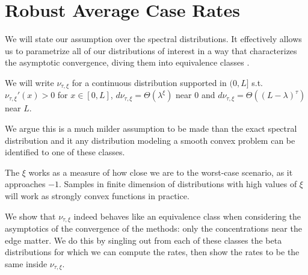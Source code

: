 \documentclass{article}
\begin{document}
\section{Robust Average Case Rates} \label{section: robust average}
We will state our assumption over the spectral distributions. It effectively allows us to parametrize all of our distributions of interest in a way that characterizes the asymptotic convergence, diving them into equivalence classes .

\begin{assumption}
We will write $\nu_{\tau,\xi}$ for a continuous distribution supported in $(0,L]$ s.t. $\nu_{\tau,\xi}'(x)>0$ for $x\in [0,L]$, $d\nu_{\tau,\xi}=\Theta( \lambda^\xi)$ near $0$ and $d\nu_{\tau,\xi}=\Theta( (L-\lambda)^\tau)$ near $L$. 
\label{assumption}
\end{assumption}

We argue this is a much milder assumption to be made than the exact spectral distribution and it  any distribution modeling a smooth convex problem can be identified to one of these classes. 


The $\xi$ works as a measure of how close we are to the worst-case scenario, as it approaches $-1$. Samples in finite dimension of distributions with high values of $\xi$ will work as strongly convex functions in practice.


We show that $\nu_{\tau,\xi}$ indeed behaves like an equivalence class when considering the asymptotics of the convergence of the methods: only the concentrations near the edge matter. We do this by singling out from each of these classes the beta distributions for which we can compute the rates, then show the rates to be the same inside $\nu_{\tau,\xi}$.
\end{document}
